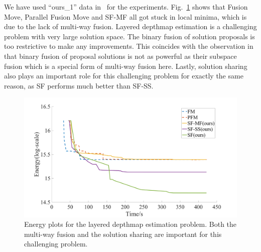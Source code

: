 
\noindent We have used ``ours\_1'' data in~\cite{layered_depthmap} for
the experiments. Fig.~\ref{fig:layered_depthmap_convergence} shows
that Fusion Move, Parallel Fusion Move and SF-MF all got stuck in local
minima, which is due to the lack of multi-way fusion.  Layered depthmap
estimation is a challenging problem with very large solution space. The
binary fusion of solution proposals is too restrictive to make any
improvements.  This coincides with the observation in
\cite{layered_depthmap} that binary fusion of proposal solutions is not
as powerful as their subspace fusion which is a special form of
multi-way fusion here. Lastly, solution sharing also plays an important
role for this challenging problem for exactly the same reason, as SF
performs much better than SF-SS.

\begin{figure}[!h]
  \centering
  \includegraphics[width=0.8\columnwidth]{figure/layered_depthmap_convergence.png}
  \caption{Energy plots for the layered depthmap estimation
    problem. Both the multi-way fusion and the solution sharing are important
    for this challenging problem.}\label{fig:layered_depthmap_convergence}
\end{figure}

